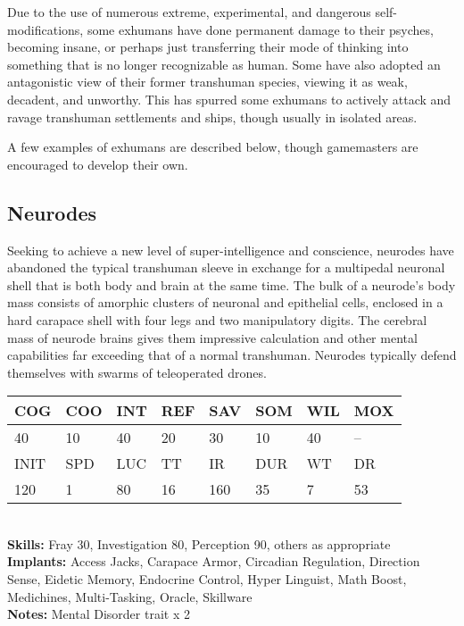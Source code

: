 Due to the use of numerous extreme, experimental, and dangerous self-modifications, some exhumans have done permanent damage to their psyches, becoming insane, or perhaps just transferring their mode of thinking into something that is no longer recognizable as human. Some have also adopted an antagonistic view of their former transhuman species, viewing it as weak, decadent, and unworthy. This has spurred some exhumans to actively attack and ravage transhuman settlements and ships, though usually in isolated areas. 

A few examples of exhumans are described below, though gamemasters are encouraged to develop their own. 

\subsection{Neurodes} 

Seeking to achieve a new level of super-intelligence and conscience, neurodes have abandoned the typical transhuman sleeve in exchange for a multipedal neuronal shell that is both body and brain at the same time. The bulk of a neurode's body mass consists of amorphic clusters of neuronal and epithelial cells, enclosed in a hard carapace shell with four legs and two manipulatory digits. The cerebral mass of neurode brains gives them impressive calculation and other mental capabilities far exceeding that of a normal transhuman. Neurodes typically defend themselves with swarms of teleoperated drones. 

\begin{tabular}{|l|l|l|l|l|l|l|l|} \hline

COG &COO &INT &REF &SAV &SOM &WIL &MOX \\ \hline

40 &10 &40 &20 &30 &10 &40 &-- \\ \hline

INIT &SPD &LUC &TT &IR &DUR &WT &DR \\ \hline

120 &1 &80 &16 &160 &35 &7 &53 \\ \hline

\end{tabular} \\ \textbf{Skills:} Fray 30, Investigation 80, Perception 90, others as appropriate \\ \textbf{Implants:} Access Jacks, Carapace Armor, Circadian Regulation, Direction Sense, Eidetic Memory, Endocrine Control, Hyper Linguist, Math Boost, Medichines, Multi-Tasking, Oracle, Skillware \\ \textbf{Notes:} Mental Disorder trait x 2 \\ 


